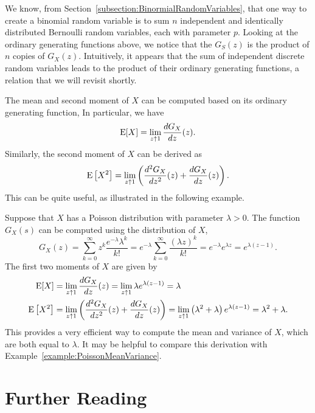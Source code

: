 We know, from Section~\ref{subsection:BinormialRandomVariables}, that one way to create a binomial random variable is to sum $n$ independent and identically distributed Bernoulli random variables, each with parameter $p$.
Looking at the ordinary generating functions above, we notice that the $G_S(z)$ is the product of $n$ copies of $G_X(z)$.
Intuitively, it appears that the sum of independent discrete random variables leads to the product of their ordinary generating functions, a relation that we will revisit shortly.

The mean and second moment of $X$ can be computed based on its ordinary generating function,
In particular, we have
\begin{equation*}
\mathrm{E} [X] = \lim_{z \uparrow 1} \frac{d G_X}{dz}(z) .
\end{equation*}
Similarly, the second moment of $X$ can be derived as
\begin{equation*}
\mathrm{E} \left[ X^2 \right]
= \lim_{z \uparrow 1} \left( \frac{d^2 G_X}{dz^2}(z) + \frac{d G_X}{dz}(z) \right) .
\end{equation*}
This can be quite useful, as illustrated in the following example.

\begin{example}
Suppose that $X$ has a Poisson distribution with parameter $\lambda > 0$.
The function $G_X(s)$ can be computed using the distribution of $X$,
\begin{equation*}
G_X(z) = \sum_{k = 0}^\infty z^{k} \frac{e^{-\lambda}\lambda^k}{k!}
= e^{-\lambda} \sum_{k = 0}^\infty \frac{(\lambda z)^k}{k!}
= e^{-\lambda} e^{\lambda z} = e^{\lambda(z - 1)} .
\end{equation*}
The first two moments of $X$ are given by
\begin{align*}
\mathrm{E} [X] &= \lim_{z \uparrow 1} \frac{d G_X}{dz} (z)
= \lim_{z \uparrow 1} \lambda e^{\lambda(z - 1)} = \lambda \\
\mathrm{E} \left[ X^2 \right] &= \lim_{z \uparrow 1}
\left( \frac{d^2 G_X}{dz^2} (z) + \frac{d G_X}{dz} (z) \right)
= \lim_{z \uparrow 1} \left( \lambda^2 + \lambda \right)
e^{\lambda (z - 1)} = \lambda^2 + \lambda .
\end{align*}
This provides a very efficient way to compute the mean and variance of $X$, which are both equal to $\lambda$.
It may be helpful to compare this derivation with Example~\ref{example:PoissonMeanVariance}.
\end{example}


\section*{Further Reading}

